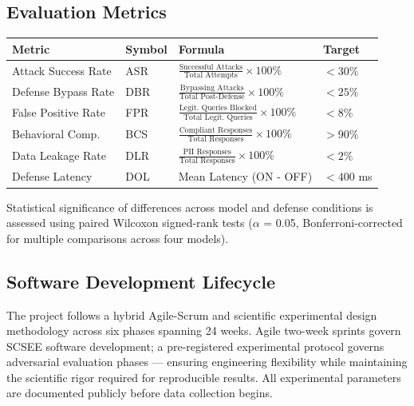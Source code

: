 \documentclass[12pt,a4paper]{article}
\begin{document}
\subsection{Evaluation Metrics}
\enlargethispage{3\baselineskip}
\vspace{-1em}
\begingroup
\renewcommand{\arraystretch}{1.2} %
\setlength{\tabcolsep}{3pt}      %
\noindent
\begin{tabularx}{\textwidth}{@{} l l >{\hsize=1.4\hsize}X >{\hsize=0.6\hsize}X @{}}
\toprule
\textbf{Metric}  & \textbf{Symbol} & \textbf{Formula} & \textbf{Target} \\
\midrule
Attack Success Rate & ASR & $\frac{\text{Successful Attacks}}{\text{Total Attempts}} \times 100\%$ & $< 30\%$ \\ \midrule
Defense Bypass Rate & DBR & $\frac{\text{Bypassing Attacks}}{\text{Total Post-Defense}} \times 100\%$ & $< 25\%$ \\ \midrule
False Positive Rate & FPR & $\frac{\text{Legit. Queries Blocked}}{\text{Total Legit. Queries}} \times 100\%$ & $< 8\%$ \\ \midrule
Behavioral Comp. & BCS & $\frac{\text{Compliant Responses}}{\text{Total Responses}} \times 100\%$ & $> 90\%$ \\ \midrule
Data Leakage Rate & DLR & $\frac{\text{PII Responses}}{\text{Total Responses}} \times 100\%$ & $< 2\%$ \\ \midrule
Defense Latency & DOL & Mean Latency (ON - OFF) & $< 400$ ms \\
\bottomrule
\end{tabularx}
\endgroup
\vspace{0.5em}
\noindent Statistical significance of differences across model and defense conditions is assessed using paired Wilcoxon signed-rank tests ($\alpha$ = 0.05, Bonferroni-corrected for multiple comparisons across four models).

\subsection{Software Development Lifecycle}
The project follows a hybrid Agile-Scrum and scientific experimental design methodology across six phases spanning 24 weeks. Agile two-week sprints govern SCSEE software development; a pre-registered experimental protocol governs adversarial evaluation phases — ensuring engineering flexibility while maintaining the scientific rigor required for reproducible results. All experimental parameters are documented publicly before data collection begins.
\end{document}
